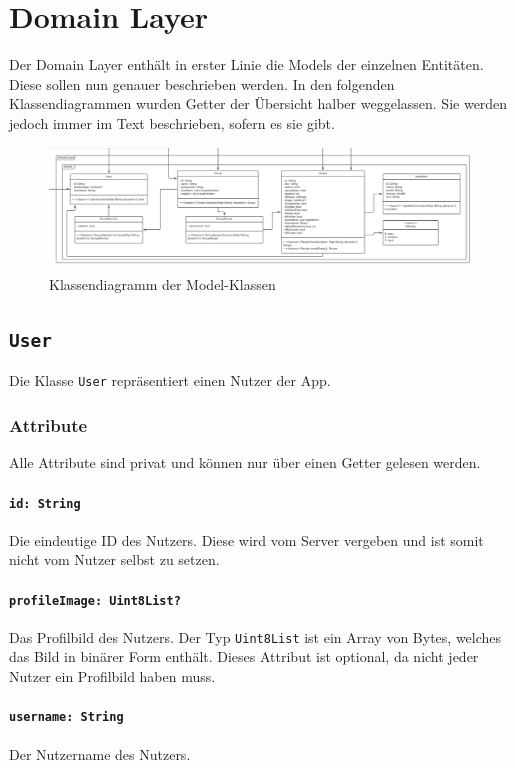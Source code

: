 \documentclass{entwurfsheft}
\begin{document}
\begin{sloppypar}
\section{Domain Layer}
Der Domain Layer enthält in erster Linie die Models der einzelnen Entitäten. Diese sollen nun genauer beschrieben werden. In den folgenden Klassendiagrammen wurden Getter der Übersicht halber weggelassen. Sie werden jedoch immer im Text beschrieben, sofern es sie gibt.
\begin{figure}[htp]
    \centering
    \includegraphics[width = \textwidth]{images/domainLayer/domainLayer.pdf}
    \caption{Klassendiagramm der Model-Klassen}
    \label{fig:domain-layer}
\end{figure}
\newpage
\subsection{\texttt{User}}
\label{sec:user}
Die Klasse \texttt{User} repräsentiert einen Nutzer der App.
\subsubsection*{Attribute}
Alle Attribute sind privat und können nur über einen Getter gelesen werden.
\paragraph{\texttt{id: String}}
Die eindeutige ID des Nutzers. Diese wird vom Server vergeben und ist somit nicht vom Nutzer selbst zu setzen.
\paragraph{\texttt{profileImage: Uint8List?}}
Das Profilbild des Nutzers. Der Typ \texttt{Uint8List} ist ein Array von Bytes, welches das Bild in binärer Form enthält. Dieses Attribut ist optional, da nicht jeder Nutzer ein Profilbild haben muss.
\paragraph{\texttt{username: String}}
Der Nutzername des Nutzers.


\end{sloppypar}
\end{document}
